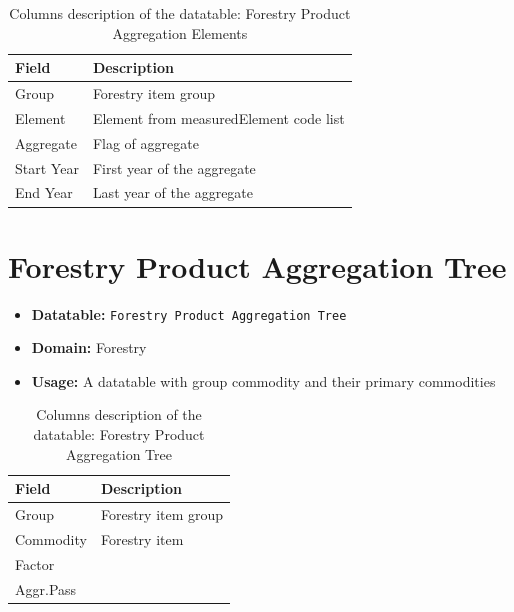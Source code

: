 \documentclass[
]{book}
\providecommand{\tightlist}{%
  \setlength{\itemsep}{0pt}\setlength{\parskip}{0pt}}
\begin{document}
\begin{table}

\caption{\label{tab:forestryproductaggregationelements}Columns description of the datatable: Forestry Product Aggregation Elements}
\centering
\fontsize{14}{16}\selectfont
\begin{tabular}[t]{l|l}
\hline
\rowcolor[HTML]{a9c9a7}  Field & Description\\
\hline
Group & Forestry item group\\
\hline
Element & Element from measuredElement code list\\
\hline
Aggregate & Flag of aggregate\\
\hline
Start Year & First year of the aggregate\\
\hline
End Year & Last year of the aggregate\\
\hline
\end{tabular}
\end{table}

\hypertarget{forestry-product-aggregation-tree}{%
\section*{Forestry Product Aggregation Tree}\label{forestry-product-aggregation-tree}}

\begin{itemize}
\tightlist
\item
  \textbf{Datatable:} \texttt{Forestry\ Product\ Aggregation\ Tree}
\item
  \textbf{Domain:} Forestry
\item
  \textbf{Usage:} A datatable with group commodity and their primary commodities
\end{itemize}

\begin{table}

\caption{\label{tab:forestryproductaggregationtree}Columns description of the datatable: Forestry Product Aggregation Tree}
\centering
\fontsize{14}{16}\selectfont
\begin{tabular}[t]{l|l}
\hline
\rowcolor[HTML]{a9c9a7}  Field & Description\\
\hline
Group & Forestry item group\\
\hline
Commodity & Forestry item\\
\hline
Factor & \\
\hline
Aggr.Pass & \\
\hline
\end{tabular}
\end{table}
\end{document}
